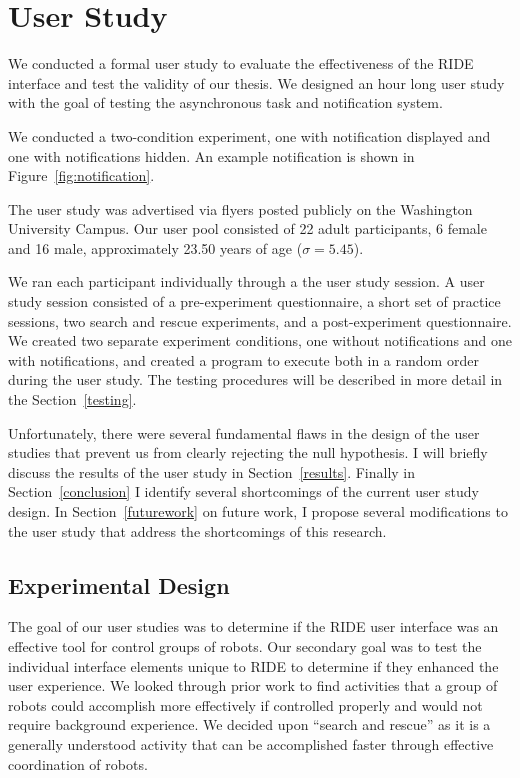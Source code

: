 \chapter{User Study}
We conducted a formal user study to evaluate the effectiveness of the RIDE interface and test the validity of our thesis. We designed an hour long user study with the goal of testing the asynchronous task and notification system.

We conducted a two-condition experiment, one with notification displayed and one with notifications hidden. An example notification is shown in Figure~\ref{fig:notification}. 

The user study was advertised via flyers posted publicly on the Washington University Campus. Our user pool consisted of 22 adult participants, 6 female and 16 male, approximately 23.50 years of age ($\sigma=5.45$).

We ran each participant individually through a the user study session. A user study session consisted of a pre-experiment questionnaire, a short set of practice sessions, two search and rescue experiments, and a post-experiment questionnaire. We created two separate experiment conditions, one without notifications and one with notifications, and created a program to execute both in a random order during the user study. The testing procedures will be described in more detail in the Section~\ref{testing}.

Unfortunately, there were several fundamental flaws in the design of the user studies that prevent us from clearly rejecting the null hypothesis. I will briefly discuss the results of the user study in Section~\ref{results}. Finally in Section~\ref{conclusion} I identify several shortcomings of the current user study design. In Section~\ref{futurework} on future work, I propose several modifications to the user study that address the shortcomings of this research.

\section{Experimental Design}
The goal of our user studies was to determine if the RIDE user interface was an effective tool for control groups of robots. Our secondary goal was to test the individual interface elements unique to RIDE to determine if they enhanced the user experience. We looked through prior work to find activities that a group of robots could accomplish more effectively if controlled properly and would not require background experience. We decided upon ``search and rescue'' as it is a generally understood activity that can be accomplished faster through effective coordination of robots. 

